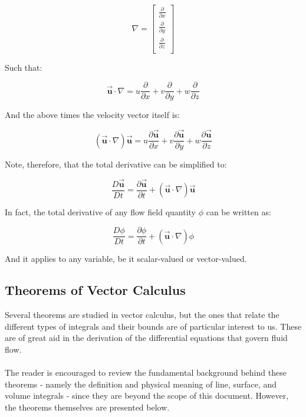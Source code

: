 \documentclass[11pt]{article}
\begin{document}
\begin{equation*}
    \nabla = \begin{bmatrix}
                \frac{\partial}{\partial x} \\
                \frac{\partial}{\partial y} \\
                \frac{\partial}{\partial z} \\     
                \end{bmatrix}
\end{equation*}

\noindent
Such that:

\begin{equation*}
    \vec{\bm{u}} \cdot \nabla = u \frac{\partial}{\partial x} + v \frac{\partial}{\partial y} + w \frac{\partial}{\partial z}
\end{equation*}

\noindent
And the above times the velocity vector itself is:

\begin{equation*}
    (\vec{\bm{u}} \cdot \nabla)\vec{\bm{u}} = u \frac{\partial\vec{\bm{u}}}{\partial x} + v \frac{\partial\vec{\bm{u}}}{\partial y} + w \frac{\partial\vec{\bm{u}}}{\partial z} 
\end{equation*}

\noindent
Note, therefore, that the total derivative can be simplified to:

\begin{equation*}
    \frac{D\vec{\bm{u}}}{Dt} = \frac{\partial\vec{\bm{u}}}{\partial t} + (\vec{\bm{u}} \cdot \nabla)\vec{\bm{u}}
\end{equation*}

\noindent
In fact, the total derivative of any flow field quantity $\phi$ can be written as:

\begin{equation*}
    \frac{D\phi}{Dt} = \frac{\partial\phi}{\partial t} + (\vec{\bm{u}} \cdot \nabla)\phi
\end{equation*}

\noindent
And it applies to any variable, be it scalar-valued or vector-valued.\\

\subsection{Theorems of Vector Calculus}
Several theorems are studied in vector calculus, but the ones that relate the different types of integrals and their bounds are of particular interest to us. These are of great aid in the derivation of the differential equations that govern fluid flow.\\ \\
\noindent
The reader is encouraged to review the fundamental background behind these theorems - namely the definition and physical meaning of line, surface, and volume integrals - since they are beyond the scope of this document. However, the theorems themselves are presented below.\\
\end{document}
